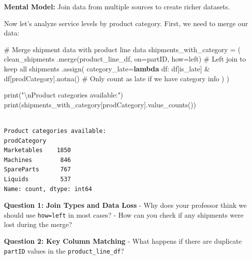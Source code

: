 \documentclass[
]{article}
\newenvironment{Shaded}{\begin{snugshade}}{\end{snugshade}}
\newcommand{\BuiltInTok}[1]{\textcolor[rgb]{0.00,0.23,0.31}{#1}}
\newcommand{\CharTok}[1]{\textcolor[rgb]{0.13,0.47,0.30}{#1}}
\newcommand{\CommentTok}[1]{\textcolor[rgb]{0.37,0.37,0.37}{#1}}
\newcommand{\KeywordTok}[1]{\textcolor[rgb]{0.00,0.23,0.31}{\textbf{#1}}}
\newcommand{\NormalTok}[1]{\textcolor[rgb]{0.00,0.23,0.31}{#1}}
\newcommand{\OperatorTok}[1]{\textcolor[rgb]{0.37,0.37,0.37}{#1}}
\newcommand{\StringTok}[1]{\textcolor[rgb]{0.13,0.47,0.30}{#1}}
\begin{document}
\textbf{Mental Model:} Join data from multiple sources to create richer
datasets.

Now let's analyze service levels by product category. First, we need to
merge our data:

\label{mental-model-6-merge-prep}
\begin{Shaded}
\begin{Highlighting}[]
\CommentTok{\# Merge shipment data with product line data}
\NormalTok{shipments\_with\_category }\OperatorTok{=}\NormalTok{ (}
\NormalTok{    clean\_shipments}
\NormalTok{    .merge(product\_line\_df, on}\OperatorTok{=}\StringTok{\textquotesingle{}partID\textquotesingle{}}\NormalTok{, how}\OperatorTok{=}\StringTok{\textquotesingle{}left\textquotesingle{}}\NormalTok{)  }\CommentTok{\# Left join to keep all shipments}
\NormalTok{    .assign(}
\NormalTok{        category\_late}\OperatorTok{=}\KeywordTok{lambda}\NormalTok{ df: df[}\StringTok{\textquotesingle{}is\_late\textquotesingle{}}\NormalTok{] }\OperatorTok{\&}\NormalTok{ df[}\StringTok{\textquotesingle{}prodCategory\textquotesingle{}}\NormalTok{].notna()  }\CommentTok{\# Only count as late if we have category info}
\NormalTok{    )}
\NormalTok{)}

\BuiltInTok{print}\NormalTok{(}\StringTok{"}\CharTok{\textbackslash{}n}\StringTok{Product categories available:"}\NormalTok{)}
\BuiltInTok{print}\NormalTok{(shipments\_with\_category[}\StringTok{\textquotesingle{}prodCategory\textquotesingle{}}\NormalTok{].value\_counts())}
\end{Highlighting}
\end{Shaded}

\begin{verbatim}

Product categories available:
prodCategory
Marketables    1850
Machines        846
SpareParts      767
Liquids         537
Name: count, dtype: int64
\end{verbatim}

\begin{tcolorbox}[enhanced jigsaw, colbacktitle=quarto-callout-important-color!10!white, toptitle=1mm, colframe=quarto-callout-important-color-frame, bottomtitle=1mm, colback=white, left=2mm, breakable, coltitle=black, bottomrule=.15mm, rightrule=.15mm, titlerule=0mm, opacityback=0, title=\textcolor{quarto-callout-important-color}{\faExclamation}\hspace{0.5em}{🤔 Discussion Questions: Merge Mental Model}, arc=.35mm, opacitybacktitle=0.6, toprule=.15mm, leftrule=.75mm]

\textbf{Question 1: Join Types and Data Loss} - Why does your professor
think we should use
\texttt{how=\textquotesingle{}left\textquotesingle{}} in most cases? -
How can you check if any shipments were lost during the merge?

\textbf{Question 2: Key Column Matching} - What happens if there are
duplicate \texttt{partID} values in the \texttt{product\_line\_df}?

\end{tcolorbox}
\end{document}
